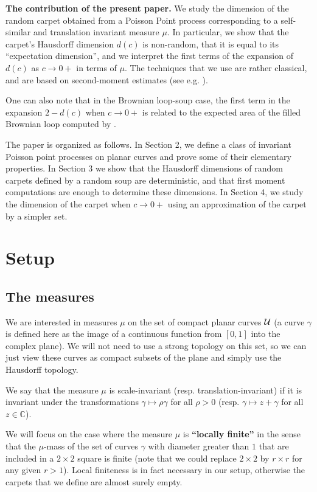 \documentclass[11pt]{article}
\newcommand{\CC}{{\mathbb C}}
\begin{document}
{\bf The contribution of the present paper.}
We study the dimension of the random carpet 
obtained from a Poisson Point process corresponding to a self-similar 
and translation invariant measure $\mu$. 
In particular, we show that the carpet's Hausdorff dimension $d(c)$ is non-random, 
that it is equal to its ``expectation dimension'', and we  interpret the first terms 
of the expansion of $d(c)$ as $c \to 0+$ in terms of $\mu$. 
The techniques that we use are rather classical, and are based on 
second-moment estimates (see e.g. \cite {MP}).

One can also note that in the Brownian loop-soup case, the first term in the expansion $2-d(c)$ when $c \to 0+$ is related to 
the expected area of the filled Brownian loop computed by \cite{GTF}.

\medbreak

The paper is organized as follows. 
In Section 2, we define  a class of invariant Poisson point processes
on planar curves and prove some of their elementary properties.
In Section 3 we show that the Hausdorff dimensions of 
random carpets defined by a random soup are deterministic,
and that first moment computations are enough to determine these dimensions.
In Section 4, we study the dimension of the carpet when $c \to 0+$ 
using an approximation of the carpet by a simpler set.

\section {Setup}

\subsection{The measures}


We are interested in measures $\mu$ on the set of compact planar curves ${\cal U}$
(a curve $\gamma$ is defined here as the image of a continuous function 
from $[0,1]$ into the complex plane). We will not need to use a strong topology on this set,
so we can just view these curves as compact subsets of the plane and 
simply use the Hausdorff topology.

 We say that the measure $\mu$ is scale-invariant (resp. translation-invariant) 
if it is invariant under the transformations $\gamma \mapsto \rho \gamma$ 
for all $\rho >0$ (resp. $\gamma \mapsto z + \gamma$ for all $z \in \CC$). 

We will focus on the case where the measure $\mu$ is {\bf ``locally finite''}
in the sense that the $\mu$-mass of the set of curves $\gamma$ with diameter greater 
than $1$ that are included in a $2 \times 2$ square is finite 
(note that we could replace $2 \times 2$ by $r \times r$ for any given $r > 1$). 
Local finiteness is in fact necessary in our setup, otherwise the carpets that we define
are almost surely empty.
\end{document}
